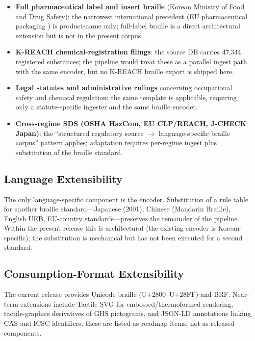 \documentclass[smallextended]{svjour3}
\begin{document}
\begin{itemize}
\item \textbf{Full pharmaceutical label and insert braille} (Korean Ministry of Food and Drug Safety): the narrowest international precedent (EU pharmaceutical packaging \cite{eu_braille}) is product-name only; full-label braille is a direct architectural extension but is not in the present corpus.
\item \textbf{K-REACH chemical-registration filings}: the source DB carries 47{,}344 registered substances; the pipeline would treat these as a parallel ingest path with the same encoder, but no K-REACH braille export is shipped here.
\item \textbf{Legal statutes and administrative rulings} concerning occupational safety and chemical regulation: the same template is applicable, requiring only a statute-specific ingester and the same braille encoder.
\item \textbf{Cross-regime SDS (OSHA HazCom, EU CLP/REACH, J-CHECK Japan)}: the ``structured regulatory source $\rightarrow$ language-specific braille corpus'' pattern applies; adaptation requires per-regime ingest plus substitution of the braille standard.
\end{itemize}

\subsection{Language Extensibility}

The only language-specific component is the encoder. Substitution of a rule table for another braille standard---Japanese (2001), Chinese (Mandarin Braille), English UEB, EU-country standards---preserves the remainder of the pipeline. Within the present release this is architectural (the existing encoder is Korean-specific); the substitution is mechanical but has not been executed for a second standard.

\subsection{Consumption-Format Extensibility}

The current release provides Unicode braille (U+2800--U+28FF) and BRF. Near-term extensions include Tactile SVG for embossed/thermoformed rendering, tactile-graphics derivatives of GHS pictograms, and JSON-LD annotations linking CAS and ICSC identifiers; these are listed as roadmap items, not as released components.
\end{document}
